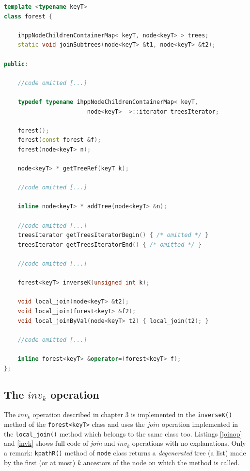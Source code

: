 \documentclass[a4paper,10pt]{report}
\begin{document}
\begin{lstlisting}[language=C++, 
	caption={partial definition of \texttt{forest<keyT>} class}, 
	label=forestClass, frame=leftline]
template <typename keyT>
class forest {

	ihppNodeChildrenContainerMap< keyT, node<keyT> > trees;
	static void joinSubtrees(node<keyT> &t1, node<keyT> &t2);

public:

	//code omitted [...]
	
	typedef typename ihppNodeChildrenContainerMap< keyT, 
						node<keyT>  >::iterator treesIterator;

	forest();
	forest(const forest &f);
	forest(node<keyT> n);

	node<keyT> * getTreeRef(keyT k);
	
	//code omitted [...]

	inline node<keyT> * addTree(node<keyT> &n);
	
	//code omitted [...]
	treesIterator getTreesIteratorBegin() { /* omitted */ }
	treesIterator getTreesIteratorEnd() { /* omitted */ }
	
	//code omitted [...]

	forest<keyT> inverseK(unsigned int k);

	void local_join(node<keyT> &t2);
	void local_join(forest<keyT> &f2);
	void local_joinByVal(node<keyT> t2) { local_join(t2); }
	
	//code omitted [...]

	inline forest<keyT> &operator=(forest<keyT> f);
};

\end{lstlisting}

\subsection{The $inv_k$ operation}

The $inv_k$ operation described in chapter 3 is implemented
in the \verb|inverseK()| method of the \verb|forest<keyT>| class 
and uses the $join$ operation implemented in 
the \verb|local_join()| method which belongs to the same class too. 
Listings \ref{joinop} and \ref{invk}
shows full code of \emph{join} and $inv_k$ operations with no  
explanations. Only a remark: \verb|kpathR()| method of \verb|node| class
returns a \emph{degenerated} tree (a list) made by the first (or at most) $k$ 
ancestors of the node on which the method is called.
\end{document}
